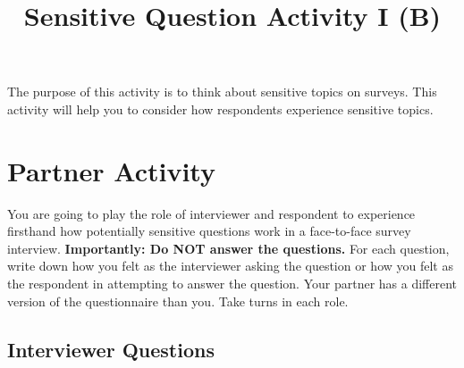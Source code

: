 \documentclass[a4, 12pt]{article}
\title{Sensitive Question Activity I (B)\vspace{-2em}}
\author{}
\date{}
\begin{document}
\maketitle

\noindent The purpose of this activity is to think about sensitive topics on surveys. This activity will help you to consider how respondents experience sensitive topics.

\section*{Partner Activity}

\noindent You are going to play the role of interviewer and respondent to experience firsthand how potentially sensitive questions work in a face-to-face survey interview. \textbf{Importantly: Do NOT answer the questions.} For each question, write down how you felt as the interviewer asking the question or how you felt as the respondent in attempting to answer the question. Your partner has a different version of the questionnaire than you. Take turns in each role.

\subsection*{Interviewer Questions}
\end{document}

